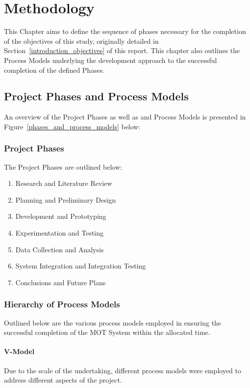\chapter{Methodology}\label{methodology}
This Chapter aims to define the sequence of phases necessary for the completion
of the objectives of this study, originally detailed in Section~\ref{introduction_objectives} of this report.
This chapter also outlines the Process Models underlying the development
approach to the successful completion of the defined Phases.

\section{Project Phases and Process Models}
An overview of the Project Phases as well as and Process Models is presented in
Figure~\ref{phases_and_process_models} below:

\subsection{Project Phases}
The Project Phases are outlined below:
\begin{enumerate}
    \item Research and Literature Review
    \item Planning and Preliminary Design
    \item Development and Prototyping 
    \item Experimentation and Testing
    \item Data Collection and Analysis
    \item System Integration and Integration Testing
    \item Conclusions and Future Plans
\end{enumerate}

\subsection{Hierarchy of Process Models}
Outlined below are the various process models employed in ensuring the
successful completion of the MOT System within the allocated time.

\subsubsection{V-Model}
Due to the scale of the undertaking, different process models were employed to
address different aspects of the project.

